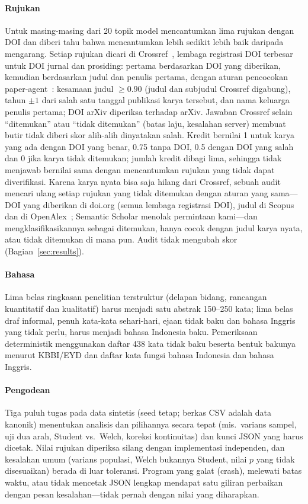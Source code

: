 \paragraph{Rujukan} Untuk masing-masing dari 20 topik model mencantumkan lima rujukan dengan DOI dan diberi tahu bahwa mencantumkan lebih sedikit lebih baik daripada mengarang. Setiap rujukan dicari di Crossref~\cite{hendricks2020crossref}, lembaga registrasi DOI terbesar untuk DOI jurnal dan prosiding: pertama berdasarkan DOI yang diberikan, kemudian berdasarkan judul dan penulis pertama, dengan aturan pencocokan paper-agent~\cite{arya2026paperagent}: kesamaan judul $\ge 0.90$ (judul dan subjudul Crossref digabung), tahun $\pm 1$ dari salah satu tanggal publikasi karya tersebut, dan nama keluarga penulis pertama; DOI arXiv diperiksa terhadap arXiv. Jawaban Crossref selain ``ditemukan'' atau ``tidak ditemukan'' (batas laju, kesalahan server) membuat butir tidak diberi skor alih-alih dinyatakan salah. Kredit bernilai 1 untuk karya yang ada dengan DOI yang benar, 0.75 tanpa DOI, 0.5 dengan DOI yang salah dan 0 jika karya tidak ditemukan; jumlah kredit dibagi lima, sehingga tidak menjawab bernilai sama dengan mencantumkan rujukan yang tidak dapat diverifikasi. Karena karya nyata bisa saja hilang dari Crossref, sebuah audit mencari ulang setiap rujukan yang tidak ditemukan dengan aturan yang sama---DOI yang diberikan di doi.org (semua lembaga registrasi DOI), judul di Scopus dan di OpenAlex~\cite{priem2022openalex}; Semantic Scholar menolak permintaan kami---dan mengklasifikasikannya sebagai ditemukan, hanya cocok dengan judul karya nyata, atau tidak ditemukan di mana pun. Audit tidak mengubah skor (Bagian~\ref{sec:results}).

\paragraph{Bahasa} Lima belas ringkasan penelitian terstruktur (delapan bidang, rancangan kuantitatif dan kualitatif) harus menjadi satu abstrak 150--250 kata; lima belas draf informal, penuh kata-kata sehari-hari, ejaan tidak baku dan bahasa Inggris yang tidak perlu, harus menjadi bahasa Indonesia baku. Pemeriksaan deterministik menggunakan daftar 438 kata tidak baku beserta bentuk bakunya menurut KBBI/EYD dan daftar kata fungsi bahasa Indonesia dan bahasa Inggris.

\paragraph{Pengodean} Tiga puluh tugas pada data sintetis (seed tetap; berkas CSV adalah data kanonik) menentukan analisis dan pilihannya secara tepat (mis.\ varians sampel, uji dua arah, Student vs.\ Welch, koreksi kontinuitas) dan kunci JSON yang harus dicetak. Nilai rujukan diperiksa silang dengan implementasi independen, dan kesalahan umum (varians populasi, Welch bukannya Student, nilai $p$ yang tidak disesuaikan) berada di luar toleransi. Program yang galat (crash), melewati batas waktu, atau tidak mencetak JSON lengkap mendapat satu giliran perbaikan dengan pesan kesalahan---tidak pernah dengan nilai yang diharapkan.

